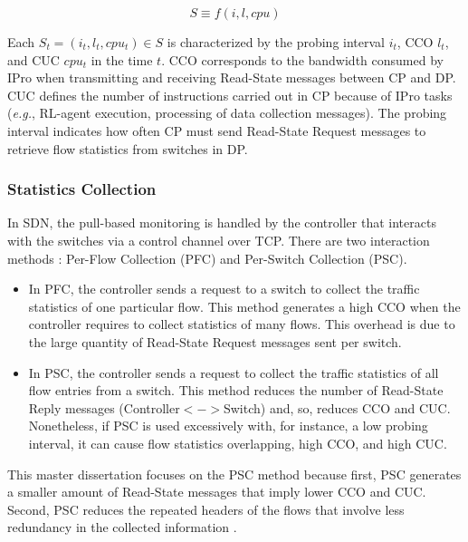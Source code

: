 {\setlength{\mathindent}{6cm}
\begin{equation}
      S\equiv f \left ( i, l, cpu \right )
    \label{equ:states_model}
\end{equation}
}

Each $S_t= \left ( i_t, l_t, cpu_t \right ) \in S$ is characterized by the probing interval $i_t$, CCO $l_t$, and CUC $cpu_t$ in the time $t$. CCO corresponds to the bandwidth consumed by IPro when transmitting and receiving Read-State messages between CP and DP. CUC defines the number of instructions carried out in CP because of IPro tasks (\textit{e.g.}, RL-agent execution, processing of data collection messages). The probing interval indicates how often CP must send Read-State Request messages to retrieve flow statistics from switches in DP.

\subsubsection{Statistics Collection} 
In SDN, the pull-based monitoring is handled by the controller that interacts with the switches via a control channel over TCP. There are two interaction methods \cite{xu_2017:wildcard_requests} \cite{su_2015:cemon}: Per-Flow Collection (PFC) and Per-Switch Collection (PSC). 

\begin{itemize}
    \item In PFC, the controller sends a request to a switch to collect the traffic statistics of one particular flow. This method generates a high CCO when the controller requires to collect statistics of many flows. This overhead is due to the large quantity of Read-State Request messages sent per switch.
    \item In PSC, the controller sends a request to collect the traffic statistics of all flow entries from a switch. This method reduces the number of Read-State Reply messages (Controller$<->$Switch) and, so, reduces CCO and CUC. Nonetheless, if PSC is used excessively with, for instance, a low probing interval, it can cause flow statistics overlapping, high CCO, and high CUC. %
\end{itemize}{}

This master dissertation focuses on the PSC method because first, PSC generates a smaller amount of Read-State messages that imply lower CCO and CUC. Second, PSC reduces the repeated headers of the flows that involve less redundancy in the collected information \cite{su_2015:cemon}.\\

